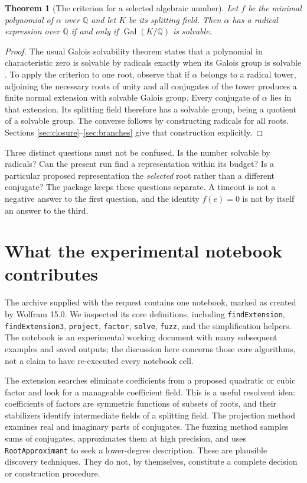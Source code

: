\documentclass[11pt,a4paper]{article}
\newtheorem{theorem}{Theorem}[section]
\theoremstyle{definition}
\theoremstyle{remark}
\newcommand{\Q}{\mathbb Q}
\newcommand{\Gal}{\operatorname{Gal}}
\newcommand{\code}[1]{\texttt{#1}}
\begin{document}
\begin{theorem}[The criterion for a selected algebraic number]
\label{thm:criterion}
Let $f$ be the minimal polynomial of $\alpha$ over $\Q$ and let $K$ be its
splitting field. Then $\alpha$ has a radical expression over $\Q$ if and only if
$\Gal(K/\Q)$ is solvable.
\end{theorem}
\begin{proof}
The usual Galois solvability theorem states that a polynomial in characteristic
zero is solvable by radicals exactly when its Galois group is solvable
\cite[Theorem 5.34]{milne}. To apply the criterion to one root, observe that if
$\alpha$ belongs to a radical tower, adjoining the necessary roots of unity and
all conjugates of the tower produces a finite normal extension with solvable
Galois group. Every conjugate of $\alpha$ lies in that extension. Its splitting
field therefore has a solvable group, being a quotient of a solvable group.
The converse follows by constructing radicals for all roots. Sections
\ref{sec:closure}--\ref{sec:branches} give that construction explicitly.
\end{proof}

Three distinct questions must not be confused. Is the number solvable by
radicals? Can the present run find a representation within its budget? Is a
particular proposed representation the \emph{selected} root rather than a
different conjugate? The package keeps these questions separate. A timeout is
not a negative answer to the first question, and the identity $f(e)=0$ is not
by itself an answer to the third.

\section{What the experimental notebook contributes}
\label{sec:notebook}
The archive supplied with the request contains one notebook, marked as created
by Wolfram 15.0. We inspected its core definitions, including
\code{findExtension}, \code{findExtension3}, \code{project}, \code{factor},
\code{solve}, \code{fuzz}, and the simplification helpers. The notebook is an
experimental working document with many subsequent examples and saved outputs;
the discussion here concerns those core algorithms, not a claim to have
re-executed every notebook cell.

The extension searches eliminate coefficients from a proposed quadratic or
cubic factor and look for a manageable coefficient field. This is a useful
resolvent idea: coefficients of factors are symmetric functions of subsets of
roots, and their stabilizers identify intermediate fields of a splitting
field. The projection method examines real and imaginary parts of conjugates.
The fuzzing method samples sums of conjugates, approximates them at high
precision, and uses \code{RootApproximant} to seek a lower-degree description.
These are plausible discovery techniques. They do not, by themselves,
constitute a complete decision or construction procedure.
\end{document}

